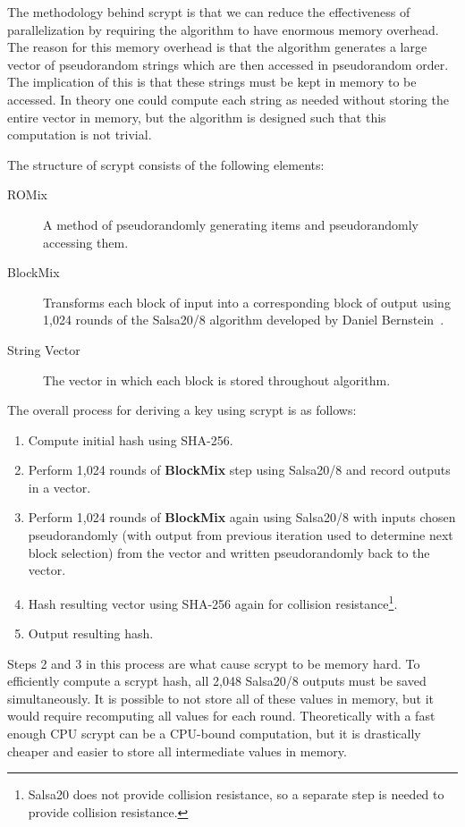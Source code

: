 \documentclass[11pt]{article}
\begin{document}
The methodology behind scrypt is that we can reduce the effectiveness of parallelization by requiring the algorithm to
have enormous memory overhead. The reason for this memory overhead is that the algorithm generates a large vector of
pseudorandom strings which are then accessed in pseudorandom order. The implication of this is that these strings must
be kept in memory to be accessed. In theory one could compute each string as needed without storing the entire vector in
memory, but the algorithm is designed such that this computation is not trivial.

The structure of scrypt consists of the following elements:
\begin{description}
    \item[ROMix] A method of pseudorandomly generating items and pseudorandomly accessing them. 
    \item[BlockMix] Transforms each block of input into a corresponding block of output using 1,024 rounds of the
        {\sc Salsa20/8} algorithm developed by Daniel Bernstein~\cite{bernstein08}.
    \item[String Vector] The vector in which each block is stored throughout algorithm.
\end{description}

The overall process for deriving a key using scrypt is as follows:
\begin{enumerate}
    \item Compute initial hash using {\sc SHA-256}.
    \item Perform 1,024 rounds of \textbf{BlockMix} step using {\sc Salsa20/8} and record outputs in a vector.
    \item Perform 1,024 rounds of \textbf{BlockMix} again using {\sc Salsa20/8} with inputs chosen pseudorandomly (with
        output from previous iteration used to determine next block selection) from the vector and written
        pseudorandomly back to the vector.
    \item Hash resulting vector using {\sc SHA-256} again for collision resistance\footnote{{\sc Salsa20} does not
            provide collision resistance, so a separate step is needed to provide collision resistance.}.
    \item Output resulting hash.
\end{enumerate}

Steps 2 and 3 in this process are what cause scrypt to be memory hard. To efficiently compute a scrypt hash, all 2,048
{\sc Salsa20/8} outputs must be saved simultaneously. It is possible to not store all of these values in memory, but it
would require recomputing all values for each round. Theoretically with a fast enough CPU scrypt can be a CPU-bound
computation, but it is drastically cheaper and easier to store all intermediate values in memory.
\end{document}
